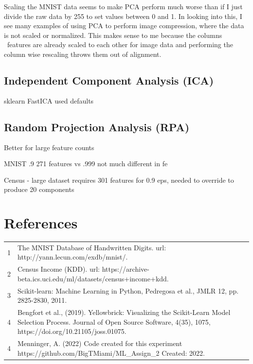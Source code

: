\documentclass[letterpaper]{article} %
\begin{document}
Scaling the MNIST data seems to make PCA perform much worse than if I just divide the raw data by 255 to set values between 0 and 1.  In looking into this, I see many examples of using PCA to perform image compression, where the data is not scaled or normalized.    This makes sense to me because the columns \ features are already scaled to each other for image data and performing the column wise rescaling throws them out of alignment.

\subsection{Independent Component Analysis (ICA)}

sklearn FastICA used defaults

\subsection{Random Projection Analysis (RPA)}
Better for large feature counts

MNIST .9 271 features vs .999 not much different in fe


Census - large dataset requires 301 features for 0.9 eps, needed to override to produce 20 components


\section{References}
\begin{tabular}{l p{2.75in}}
\\
1 & The MNIST Database of Handwritten Digits. url: http://yann.lecun.com/exdb/mnist/.
\\
2 & Census Income (KDD). url: https://archive-beta.ics.uci.edu/ml/datasets/census+income+kdd.
\\
3 & Scikit-learn: Machine Learning in Python, Pedregosa et al., JMLR 12, pp. 2825-2830, 2011.
\\
4 & Bengfort et al., (2019). Yellowbrick: Visualizing the Scikit-Learn Model Selection Process. Journal of Open Source Software, 4(35), 1075, https://doi.org/10.21105/joss.01075.
\\
4 & Menninger, A. (2022)  Code created for this experiment https://github.com/BigTMiami/ML\_Assign\_2  Created: 2022.
\end{tabular}
\end{document}
